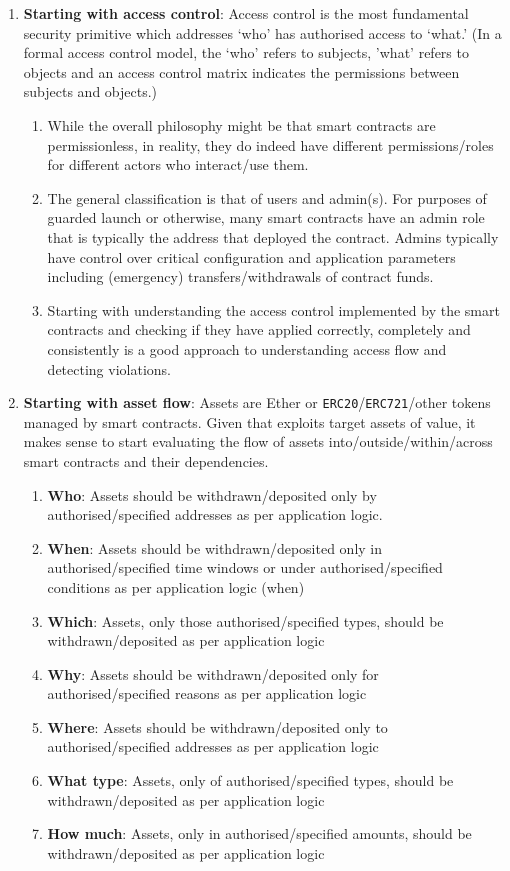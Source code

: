 \begin{enumerate}
\item\textbf{Starting with access control}: Access control is the most fundamental security primitive which addresses ‘who’ has authorised access to ‘what.’ (In a formal access control model, the ‘who’ refers to subjects, ’what’ refers to objects and an access control matrix indicates the permissions between subjects and objects.)
	\begin{enumerate}
	\item While the overall philosophy might be that smart contracts are permissionless, in reality, they do indeed have different permissions/roles for different actors who interact/use them.
	\item The general classification is that of users and admin(s). For purposes of guarded launch or otherwise, many smart contracts have an admin role that is typically the address that deployed the contract. Admins typically have control over critical configuration and application parameters including (emergency) transfers/withdrawals of contract funds.
	\item Starting with understanding the access control implemented by the smart contracts and checking if they have applied correctly, completely and consistently is a good approach to understanding access flow and detecting violations.
	\end{enumerate}

\item\textbf{Starting with asset flow}: Assets are Ether or \verb|ERC20|/\verb|ERC721|/other tokens managed by smart contracts. Given that exploits target assets of value, it makes sense to start evaluating the flow of assets into/outside/within/across smart contracts and their dependencies.
	\begin{enumerate}
	\item\textbf{Who}: Assets should be withdrawn/deposited only by authorised/specified addresses as per application logic.
	\item\textbf{When}: Assets should be withdrawn/deposited only in authorised/specified time windows or under authorised/specified conditions as per application logic (when)
	\item\textbf{Which}: Assets, only those authorised/specified types, should be withdrawn/deposited as per application logic
	\item\textbf{Why}: Assets should be withdrawn/deposited only for authorised/specified reasons as per application logic
	\item\textbf{Where}: Assets should be withdrawn/deposited only to authorised/specified addresses as per application logic
	\item\textbf{What type}: Assets, only of authorised/specified types, should be withdrawn/deposited as per application logic
	\item\textbf{How much}: Assets, only in authorised/specified amounts, should be withdrawn/deposited as per application logic
	\end{enumerate}


\end{enumerate}
